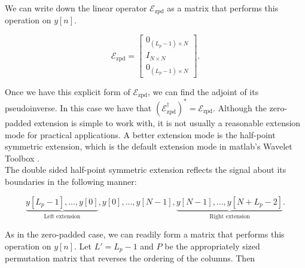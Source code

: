 \documentclass[journal]{IEEEtran}
\begin{document}
\noindent We can write down the linear operator $\mathcal{E}_\text{zpd}$ as a matrix that performs this operation on $y[n]$.

\[ \mathcal{E}_\text{zpd} = \begin{bmatrix} 0_{(L_p-1)\times N}\\ I_{N\times N}\\ 0_{(L_p-1)\times N}\end{bmatrix}. \] 

\noindent Once we have this explicit form of $\mathcal{E}_\text{zpd}$, we can find the adjoint of its pseudoinverse.  In this case we have that $\left(\mathcal{E}_\text{zpd}^\dagger\right)^\ast = \mathcal{E}_\text{zpd}$.  Although the zero-padded extension is simple to work with, it is not usually a reasonable extension mode for practical applications.  A better extension mode is the half-point symmetric extension, which is the default extension mode in {\sc matlab}'s Wavelet Toolbox \cite{matlab_wt_2015}.\\

The double sided half-point symmetric extension reflects the signal about its boundaries in the following manner:

\[ \underbrace{y[L_p-1], ..., y[0]}_\text{Left extension}, y[0], ..., y[N-1], \underbrace{y[N-1], ..., y[N+L_p-2]}_\text{Right extension}. \] 

\noindent As in the zero-padded case, we can readily form a matrix that performs this operation on $y[n]$.  Let $L'=L_p-1$ and $P$ be the appropriately sized permutation matrix that reverses the ordering of the columns.  Then
\end{document}
